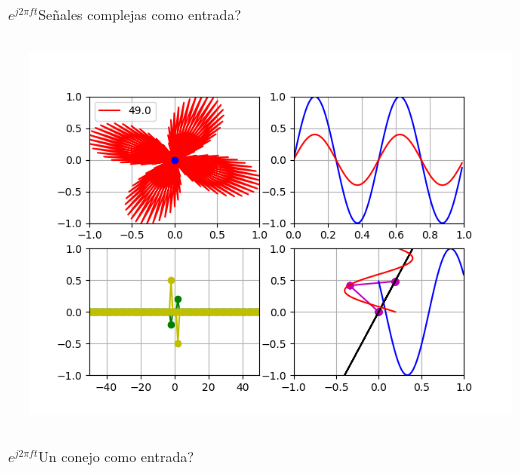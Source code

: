 \begin{frame}{$e^{j2\pi ft}$}{Señales complejas como entrada?}
   \handsonicon
   \begin{columns}[c]
      \hspace{2pt}
      \begin{column}{.5\textwidth}
         
      \end{column}
      \hspace{2pt}
      \vrule
      \hspace{2pt}
      \begin{column}{.4\textwidth}
         \centering\includegraphics[width=1.0\textwidth]{3_clase/euler7}
      \end{column}
      \hspace{2pt}
   \end{columns}
   \vfill
\end{frame}
\begin{frame}{$e^{j2\pi ft}$}{Un conejo como entrada?}
   \handsonicon
   \begin{columns}[c]
      \hspace{2pt}
      \begin{column}{.5\textwidth}
         
      \end{column}
      \hspace{2pt}
      \vrule
      \hspace{2pt}
      \begin{column}{.5\textwidth}
         
      \end{column}
   \end{columns}
   \vfill
\end{frame}
